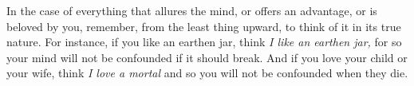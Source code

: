 In the case of everything that allures  the mind, or offers an advantage, or is
beloved by you,  remember, from the least  thing upward, to think of  it in its
true nature. For  instance, if you like  an earthen jar, think  \emph{I like an
earthen jar,} for so  your mind will not be confounded if  it should break. And
if you love  your child or your wife,  think \emph{I love a mortal}  and so you
will not be confounded when they die.
